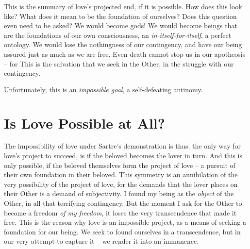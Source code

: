 This is the summary of love's projected end, if it is possible.  How does this look like? What does it mean to be the foundation of ourselves? Does this question even need to be asked? We would become gods! We would become beings that are the foundations of our own consciousness, an \emph{in-itself-for-itself}, a perfect ontology.  We would lose the nothingness of our contingency, and have our being assured just as much as we are free. Even death cannot stop us in our apotheosis -- for  This is the salvation that we seek in the Other, in the struggle with our contingency.

\noindent
Unfortunately, this is an \emph{impossible goal}, a self-defeating antinomy.

\section{Is Love Possible at All?}

The impossibility of love under Sartre's demonstration is thus: the only way for love's project to succeed, is if the beloved becomes the lover in turn. And this is only possible, if the beloved themselves form the project of love -- a pursuit of their own foundation in their beloved. This symmetry is an annihilation of the very possibility of the project of love, for the demands that the lover places on their Other is a demand of subjectivity. I found my being as the \emph{object} of the Other, in all that terrifying contingency. But the moment I ask for the Other to become a freedom \emph{of my freedom}, it loses the very transcendence that made it free.  This is the reason why love is an impossible project, as a means of seeking a foundation for our being. We seek to found ourselves in a transcendence, but in our very attempt to capture it -- we render it into an immanence. 

